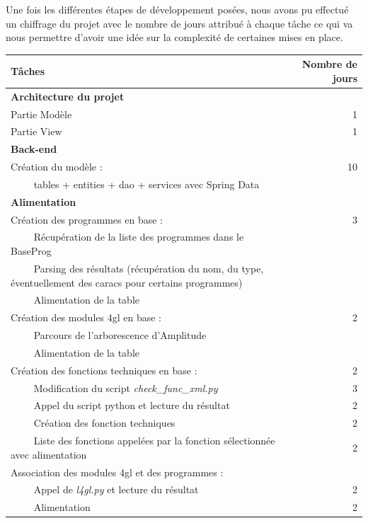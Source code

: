 \documentclass{polytech/polytech}
\begin{document}
Une fois les différentes étapes de développement posées, nous avons pu effectué un chiffrage du projet avec le nombre de jours attribué à chaque tâche ce qui va nous permettre d'avoir une idée sur la complexité de certaines mises en place.

\begin{longtable}{|L{12cm}|r|}
	\hline 
	\textbf{Tâches}	& \textbf{Nombre de jours} \\ 
	\hline
	\hline 
	\textbf{Architecture du projet} &  \\ 
	Partie Modèle	& 1 \\
	Partie View 	& 1 \\ 
	\hline 
	\textbf{Back-end}	&  \\ 
	Création du modèle : & 10 \\
	~~\llap{\textbullet}~~ tables + entities + dao + services avec Spring Data &  \\ 
	\hline 
	\textbf{Alimentation}	&  \\ 
	Création des programmes en base : & 3 \\
	~~\llap{\textbullet}~~ Récupération de la liste des programmes dans le BaseProg &  \\ 
	~~\llap{\textbullet}~~ Parsing des résultats (récupération du nom, du type, éventuellement des caracs pour certains programmes) &  \\ 
	~~\llap{\textbullet}~~ Alimentation de la table &  \\ 
	Création des modules 4gl en base : & 2 \\
	~~\llap{\textbullet}~~ Parcours de l'arborescence d'Amplitude &  \\ 
	~~\llap{\textbullet}~~ Alimentation de la table &  \\ 
	Création des fonctions techniques en base : & 2 \\
	~~\llap{\textbullet}~~ Modification du script \textit{check\_func\_xml.py} & 3 \\ 
	~~\llap{\textbullet}~~ Appel du script python et lecture du résultat & 2 \\ 
	~~\llap{\textbullet}~~ Création des fonction techniques & 2 \\ 
	~~\llap{\textbullet}~~ Liste des fonctions appelées par la fonction sélectionnée avec alimentation & 2 \\ 
	Association des modules 4gl et des programmes : & \\
	~~\llap{\textbullet}~~ Appel de \textit{l4gl.py} et lecture du résultat & 2 \\ 
	~~\llap{\textbullet}~~ Alimentation & 2 \\ 

\end{longtable}
\end{document}
